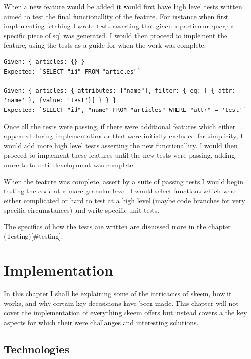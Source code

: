 \documentclass[
  12pt,
]{article}
\begin{document}
When a new feature would be added it would first have high level tests
written aimed to test the final functionallity of the feature. For
instance when first implementing fetching I wrote tests asserting that
given a particular query a specific piece of sql was generated. I would
then proceed to implement the feature, using the tests as a guide for
when the work was complete.

\begin{lstlisting}[caption={Example of what the high level tests would assert (not actual tests)}]
Given: { articles: {} }
Expected: `SELECT "id" FROM "articles"`

Given: { articles: { attributes: ["name"], filter: { eq: [ { attr: 'name' }, {value: 'test'}] } } }
Expected: `SELECT "id", "name" FROM "articles" WHERE "attr" = 'test'`
\end{lstlisting}

Once all the tests were passing, if there were additional features which
either appeared during implementation or that were initially excluded
for simplicity, I would add more high level tests asserting the new
functionallity. I would then proceed to implement these features until
the new tests were passing, adding more tests until development was
complete.

When the feature was complete, assert by a suite of passing tests I
would begin testing the code at a more granular level. I would select
functions which were either complicated or hard to test at a high level
(maybe code branches for very specific circumstances) and write specific
unit tests.

The specifics of how the tests are written are discussed more in the
chapter (Testing){[}\#testing{]}.

\hypertarget{implementation}{%
\section{Implementation}\label{implementation}}

In this chapter I shall be explaining some of the intricacies of skeem,
how it works, and why certain key decesicions have been made. This
chapter will not cover the implementation of everything skeem offers but
instead covers a the key aspects for which their were challanges and
interesting solutions.

\hypertarget{technologies}{%
\subsection{Technologies}\label{technologies}}
\end{document}

